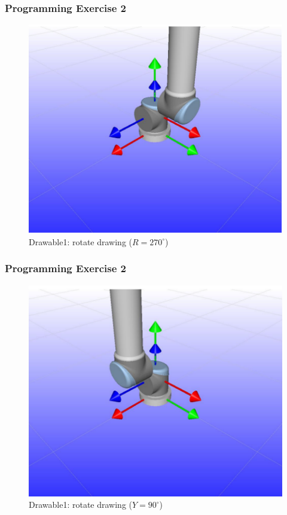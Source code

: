 \documentclass{beamer}
\begin{document}

\begin{frame}
  \frametitle{Programming Exercise 2}
  \begin{centering}
    \begin{figure}
    \includegraphics[height=0.6\textheight]{./graphics/ex33_11}
    \caption{Drawable1: rotate drawing ($R=270^{\circ}$)}
    \end{figure}
    \end{centering}
  \end{frame}
  

\begin{frame}
  \frametitle{Programming Exercise 2}
  \begin{centering}
    \begin{figure}
    \includegraphics[height=0.6\textheight]{./graphics/ex33_12}
    \caption{Drawable1: rotate drawing ($Y=90^{\circ}$)}
    \end{figure}
    \end{centering}
  \end{frame}
  
\end{document}
